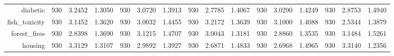 \begin{table}[htbp]
{\begin{tabular}{rccccccccccccccc}
                  diabetic                            & 930                                     & 3.2452                                                                    & 1.3050          & 930                            & 3.0720                                                                    & 1.3913          & 930                             & \cellcolor[rgb]{ .776,  .937,  .808}\textcolor[rgb]{ 0,  .38,  0}{2.7785}          & 1.4067          & 930                             & 3.0290                                                                    & 1.4249          & 930                             & 2.8753                                                                    & 1.4940          \\
                  fish\_toxicity                      & 930                                     & 3.1452                                                                    & 1.3620          & 930                            & 3.0032                                                                    & 1.4455          & 930                             & 3.2172                                                                             & 1.3639          & 930                             & 3.1000                                                                    & 1.4088          & 930                             & \cellcolor[rgb]{ .776,  .937,  .808}\textcolor[rgb]{ 0,  .38,  0}{2.5344} & 1.3879          \\
                  forest\_fires                       & 930                                     & \cellcolor[rgb]{ .776,  .937,  .808}\textcolor[rgb]{ 0,  .38,  0}{2.8398} & 1.3690          & 930                            & 3.1215                                                                    & 1.4707          & 930                             & 3.0043                                                                             & 1.3181          & 930                             & 2.8860                                                                    & 1.3535          & 930                             & 3.1484                                                                    & 1.5261          \\
                  housing                             & 930                                     & 3.3129                                                                    & 1.3107          & 930                            & 2.9892                                                                    & 1.3927          & 930                             & \cellcolor[rgb]{ .776,  .937,  .808}\textcolor[rgb]{ 0,  .38,  0}{2.6871}          & 1.4833          & 930                             & 2.6968                                                                    & 1.4965          & 930                             & 3.3140                                                                    & 1.2356          \\

\end{tabular}}
\end{table}
